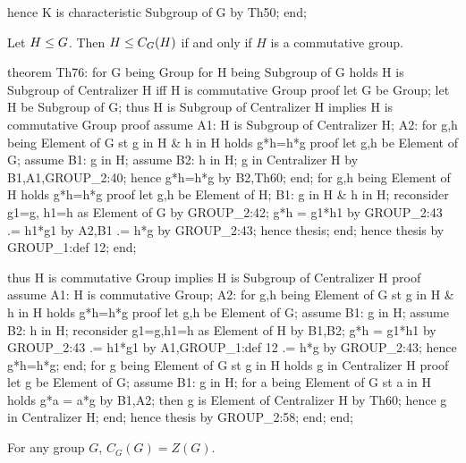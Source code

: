   hence K is characteristic Subgroup of G by Th50;
end;
\eatline
{}\nwendcode{}\nwdocspar
\begin{theorem}
Let $H\leq G$.
Then $H\leq C_{G}(H)$ if and only if $H$ is a commutative group.
\end{theorem}

\nwenddocs{}\endmoddef\nwstartdeflinemarkup{}\nwenddeflinemarkup
theorem Th76:
  for G being Group
  for H being Subgroup of G
  holds H is Subgroup of Centralizer H iff H is commutative Group
proof
  let G be Group;
  let H be Subgroup of G;
  thus H is Subgroup of Centralizer H implies H is commutative Group
  proof
    assume A1: H is Subgroup of Centralizer H;
    A2: for g,h being Element of G st g in H & h in H holds g*h=h*g
    proof
      let g,h be Element of G;
      assume B1: g in H;
      assume B2: h in H;
      g in Centralizer H by B1,A1,GROUP_2:40;
      hence g*h=h*g by B2,Th60;
    end;
    for g,h being Element of H holds g*h=h*g
    proof
      let g,h be Element of H;
      B1: g in H & h in H;
      reconsider g1=g, h1=h as Element of G by GROUP_2:42;
      g*h = g1*h1 by GROUP_2:43
         .= h1*g1 by A2,B1
         .= h*g by GROUP_2:43;
      hence thesis;
    end;
    hence thesis by GROUP_1:def 12;
  end;

  thus H is commutative Group implies H is Subgroup of Centralizer H
  proof
    assume A1: H is commutative Group;
    A2: for g,h being Element of G st g in H & h in H holds g*h=h*g
    proof
      let g,h be Element of G;
      assume B1: g in H;
      assume B2: h in H;
      reconsider g1=g,h1=h as Element of H by B1,B2;
      g*h = g1*h1 by GROUP_2:43
         .= h1*g1 by A1,GROUP_1:def 12
         .= h*g by GROUP_2:43;
      hence g*h=h*g;
    end;
    for g being Element of G st g in H holds g in Centralizer H
    proof
      let g be Element of G;
      assume B1: g in H;
      for a being Element of G st a in H holds g*a = a*g by B1,A2;
      then g is Element of Centralizer H by Th60;
      hence g in Centralizer H;
    end;
    hence thesis by GROUP_2:58;
  end;
end;
\eatline
{}\nwendcode{}\nwdocspar
\begin{theorem}
For any group $G$, $C_{G}(G)=Z(G)$.
\end{theorem}

